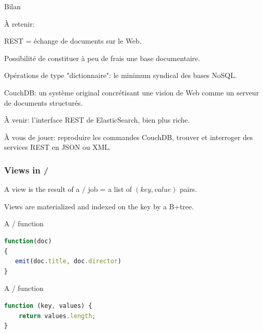 \begin{frame}{Bilan}

À retenir:

\begin{redbullet}
  \item REST = échange de documents sur le Web.
  \item Possibilité de constituer à peu de frais une base documentaire.
  \item  Opérations de type "dictionnaire": le minimum syndical des bases NoSQL.
  \item CouchDB: un système original concrétisant une vision de Web comme
      un serveur de documents structurés.
      
\end{redbullet}

À venir: l'interface REST de ElasticSearch, bien plus riche.

\vfill

À vous de jouer: reproduire les commandes CouchDB, trouver et interroger des services REST
en JSON ou XML.



\end{frame}




\begin{frame}[fragile]
\frametitle{Views in \couchdb/}

A \alert{view} is the result of a \mapreduce/ job = a list of $(key, value)$
pairs.

\vfill

Views are \alert{materialized} and indexed on the key by a B+tree.

\vfill
A \map/ function


\begin{lstlisting}[language=JavaScript]
function(doc)
{
   emit(doc.title, doc.director)
}
\end{lstlisting}

\vfill
A \reduce/ function


\begin{lstlisting}[language=JavaScript]
function (key, values) {
    return values.length;
}
\end{lstlisting}
\end{frame}

